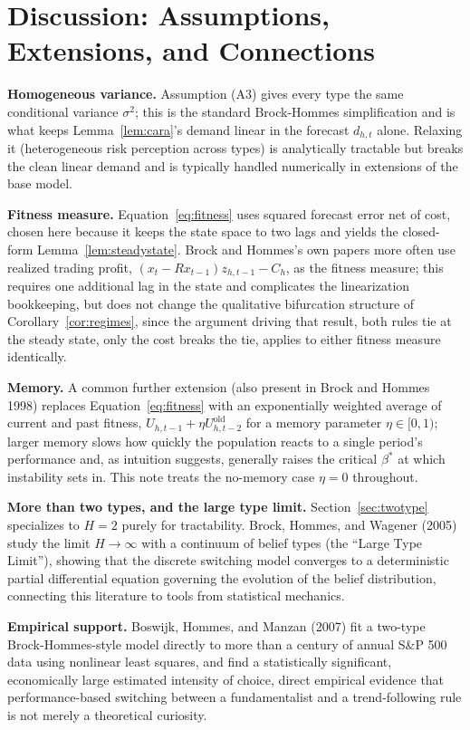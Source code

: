 \documentclass[11pt]{article}
\theoremstyle{remark}
\theoremstyle{definition}
\begin{document}
\section{Discussion: Assumptions, Extensions, and Connections}
\label{sec:discussion}

\textbf{Homogeneous variance.} Assumption (A3) gives every type the same conditional variance $\sigma^2$; this is the standard Brock-Hommes simplification and is what keeps Lemma~\ref{lem:cara}'s demand linear in the forecast $d_{h,t}$ alone. Relaxing it (heterogeneous risk perception across types) is analytically tractable but breaks the clean linear demand and is typically handled numerically in extensions of the base model.

\textbf{Fitness measure.} Equation~\eqref{eq:fitness} uses squared forecast error net of cost, chosen here because it keeps the state space to two lags and yields the closed-form Lemma~\ref{lem:steadystate}. Brock and Hommes's own papers more often use realized trading profit, $(x_{t}-Rx_{t-1})z_{h,t-1}-C_h$, as the fitness measure; this requires one additional lag in the state and complicates the linearization bookkeeping, but does not change the qualitative bifurcation structure of Corollary~\ref{cor:regimes}, since the argument driving that result, both rules tie at the steady state, only the cost breaks the tie, applies to either fitness measure identically.

\textbf{Memory.} A common further extension (also present in Brock and Hommes 1998) replaces Equation~\eqref{eq:fitness} with an exponentially weighted average of current and past fitness, $U_{h,t-1}+\eta U_{h,t-2}^{\text{old}}$ for a memory parameter $\eta\in[0,1)$; larger memory slows how quickly the population reacts to a single period's performance and, as intuition suggests, generally raises the critical $\beta^{*}$ at which instability sets in. This note treats the no-memory case $\eta=0$ throughout.

\textbf{More than two types, and the large type limit.} Section~\ref{sec:twotype} specializes to $H=2$ purely for tractability. Brock, Hommes, and Wagener (2005) study the limit $H\to\infty$ with a continuum of belief types (the ``Large Type Limit''), showing that the discrete switching model converges to a deterministic partial differential equation governing the evolution of the belief distribution, connecting this literature to tools from statistical mechanics.

\textbf{Empirical support.} Boswijk, Hommes, and Manzan (2007) fit a two-type Brock-Hommes-style model directly to more than a century of annual S\&P 500 data using nonlinear least squares, and find a statistically significant, economically large estimated intensity of choice, direct empirical evidence that performance-based switching between a fundamentalist and a trend-following rule is not merely a theoretical curiosity.
\end{document}
